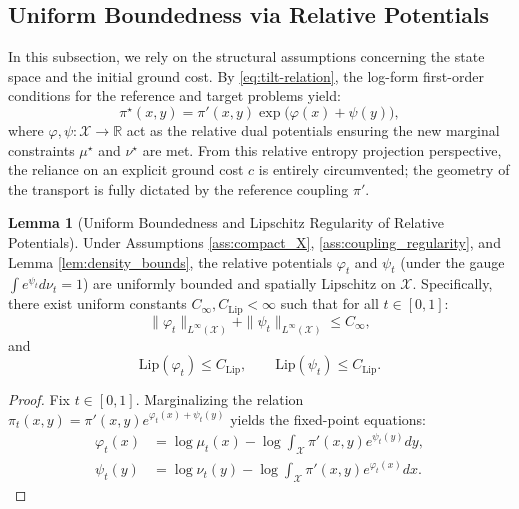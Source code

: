 \documentclass[11pt]{article}
\theoremstyle{definition}
\newtheorem{lemma}[theorem]{Lemma}
\numberwithin{equation}{section}%
\begin{document}
{\subsection{Uniform Boundedness via Relative Potentials}
In this subsection, we rely on the structural assumptions concerning the state space and the initial ground cost. By \eqref{eq:tilt-relation}, the log-form first-order conditions for the reference and target problems yield:
\begin{equation*}
\pi^\star(x,y) = \pi'(x,y) \exp\big(\varphi(x) + \psi(y)\big),
\end{equation*}
where $\varphi, \psi : \mathcal{X} \to \mathbb{R}$ act as the relative dual potentials ensuring the new marginal constraints $\mu^\star$ and $\nu^\star$ are met. From this relative entropy projection perspective, the reliance on an explicit ground cost $c$ is entirely circumvented; the geometry of the transport is fully dictated by the reference coupling $\pi'$.

\begin{lemma}[Uniform Boundedness and Lipschitz Regularity of Relative Potentials]
\label{lem:phi_psi_regularity}
Under Assumptions \ref{ass:compact_X}, \ref{ass:coupling_regularity}, and Lemma \ref{lem:density_bounds}, the relative potentials $\varphi_t$ and $\psi_t$ (under the gauge $\int e^{\psi_t} d\nu_t = 1$) are uniformly bounded and spatially Lipschitz on $\mathcal{X}$. Specifically, there exist uniform constants $C_{\infty}, C_{\mathrm{Lip}} < \infty$ such that for all $t \in [0,1]$:
\[
\|\varphi_t\|_{L^\infty(\mathcal{X})} + \|\psi_t\|_{L^\infty(\mathcal{X})} \le C_{\infty},
\]
and
\[
\mathrm{Lip}(\varphi_t) \le C_{\mathrm{Lip}}, \qquad \mathrm{Lip}(\psi_t) \le C_{\mathrm{Lip}}.
\]
\end{lemma}

\begin{proof}
Fix $t \in [0,1]$. Marginalizing the relation $\pi_t(x,y) = \pi'(x,y) e^{\varphi_t(x) + \psi_t(y)}$ yields the fixed-point equations:
\begin{equation}
\label{eq:phipsi_sinkhorn}
\begin{aligned}
\varphi_t(x) &= \log \mu_t(x) - \log \int_{\mathcal{X}} \pi'(x,y) e^{\psi_t(y)} dy, \\
\psi_t(y) &= \log \nu_t(y) - \log \int_{\mathcal{X}} \pi'(x,y) e^{\varphi_t(x)} dx.
\end{aligned}
\end{equation}


\end{proof}}
\end{document}
